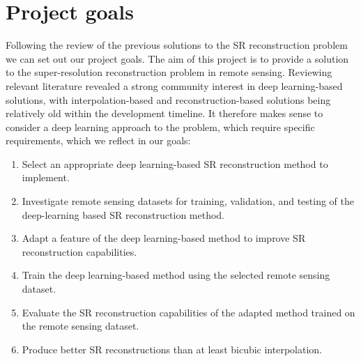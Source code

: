 \section{Project goals}
Following the review of the previous solutions to the SR reconstruction problem we can set out our project goals. The aim of this project is to provide a solution to the super-resolution reconstruction problem in remote sensing. Reviewing relevant literature revealed a strong community interest in deep learning-based solutions, with interpolation-based and reconstruction-based solutions being relatively old within the development timeline. It therefore makes sense to consider a deep learning approach to the problem, which require specific requirements, which we reflect in our goals:
\begin{enumerate}
    \item Select an appropriate deep learning-based SR reconstruction method to implement.
    \item Investigate remote sensing datasets for training, validation, and testing of the deep-learning based SR reconstruction method.
    \item Adapt a feature of the deep learning-based method to improve SR reconstruction capabilities.
    \item Train the deep learning-based method using the selected remote sensing dataset.
    \item Evaluate the SR reconstruction capabilities of the adapted method trained on the remote sensing dataset.
    \item Produce better SR reconstructions than at least bicubic interpolation.
\end{enumerate}